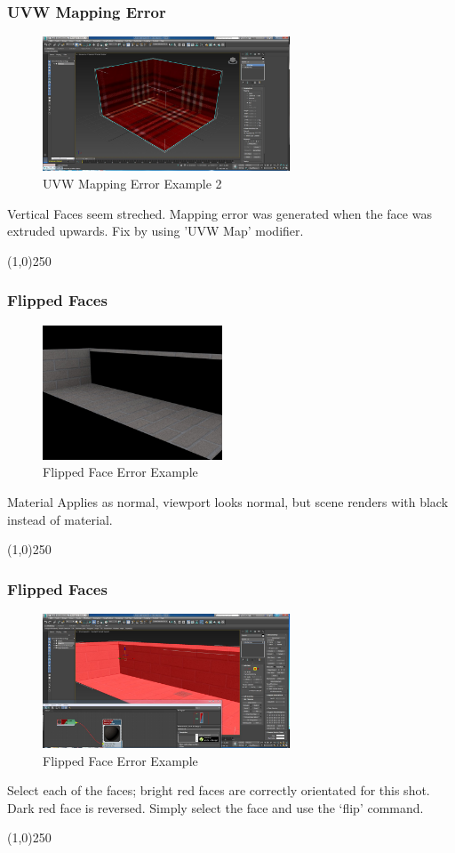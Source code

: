 \begin{frame}
\frametitle{UVW Mapping Error}
\begin{figure}
	\centering
	\includegraphics[height=4.0cm]{./MaterialsErrors/UVWErrorFixed}
	\caption{UVW Mapping Error Example 2}
	\label{fig:UVWError2}
\end{figure}
Vertical Faces seem streched.  Mapping error was generated when the face was extruded upwards.  Fix by using 'UVW Map' modifier.
\end{frame}
\begin{center}\line(1,0){250}\end{center}


\begin{frame}
\frametitle{Flipped Faces}
\begin{figure}
	\centering
	\includegraphics[height=4.0cm]{./MaterialsErrors/FaceErrorFlipped}
	\caption{Flipped Face Error Example}
	\label{fig:FlippedFacesError2}
\end{figure}
Material Applies as normal, viewport looks normal, but scene renders with black instead of material.
\end{frame}
\begin{center}\line(1,0){250}\end{center}


\begin{frame}
\frametitle{Flipped Faces}
\begin{figure}
	\centering
	\includegraphics[height=4.0cm]{./MaterialsErrors/FaceErrorFlipped3DS}
	\caption{Flipped Face Error Example}
	\label{fig:FlippedFacesError3DSView2}
\end{figure}
Select each of the faces; bright red faces are correctly orientated for this shot.  Dark red face is reversed.  Simply select the face and use the `flip' command.
\end{frame}
\begin{center}\line(1,0){250}\end{center}




